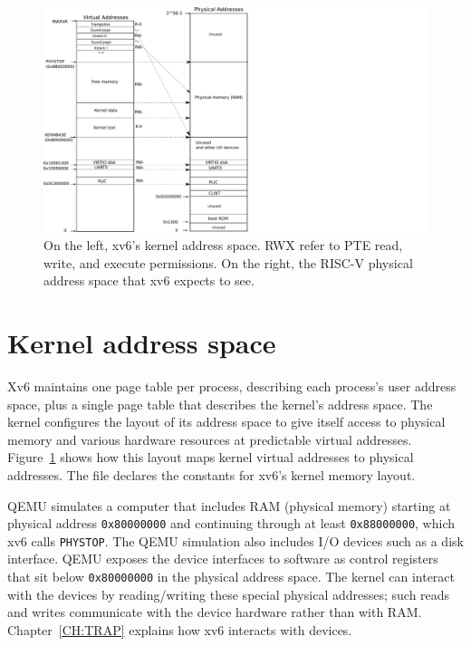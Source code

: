 \begin{figure}[h]
\centering
 \includegraphics[scale=0.65]{fig/xv6_layout.pdf}
\caption{On the left, xv6's kernel address space.
{\sf \small{RWX}}
refer to PTE read, write, and execute permissions.
On the right, the RISC-V physical address space that
xv6 expects to see.}
\label{fig:xv6_layout}
\end{figure}

\section{Kernel address space}
Xv6 maintains one page table per process, describing each
process's user address space, plus a single page table
that describes the kernel's address space.
The kernel configures the layout of its address space to
give itself
access to physical memory and
various hardware resources at predictable virtual addresses.
Figure~\ref{fig:xv6_layout}
shows how this layout maps
kernel virtual addresses to physical addresses.  The file
declares the constants for xv6's kernel memory layout.

QEMU simulates a computer that includes RAM (physical memory) starting
at physical address \texttt{0x80000000} and continuing through
at least \texttt{0x88000000}, which xv6 calls \texttt{PHYSTOP}.
The QEMU simulation also
includes I/O devices
such as a disk interface.
QEMU exposes the device interfaces to software as
control registers that sit below
\texttt{0x80000000}
in the physical address space.
The kernel can interact with the devices by reading/writing
these special physical addresses; such reads and writes communicate
with the device hardware rather than with RAM.
Chapter~\ref{CH:TRAP} explains
how xv6 interacts with devices.

